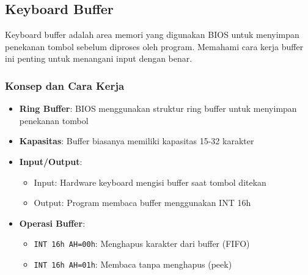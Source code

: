 \documentclass[../main.tex]{subfiles}
\begin{document}
\subsection{Keyboard Buffer}
            Keyboard buffer adalah area memori yang digunakan BIOS untuk menyimpan penekanan tombol sebelum diproses oleh program. Memahami cara kerja buffer ini penting untuk menangani input dengan benar.

            \subsubsection{Konsep dan Cara Kerja}
\begin{itemize}
    \item \textbf{Ring Buffer}: BIOS menggunakan struktur ring buffer untuk menyimpan penekanan tombol
    \item \textbf{Kapasitas}: Buffer biasanya memiliki kapasitas 15-32 karakter
    \item \textbf{Input/Output}: 
        \begin{itemize}
            \item Input: Hardware keyboard mengisi buffer saat tombol ditekan
            \item Output: Program membaca buffer menggunakan INT 16h
        \end{itemize}
    \item \textbf{Operasi Buffer}:
        \begin{itemize}
            \item \texttt{INT 16h AH=00h}: Menghapus karakter dari buffer (FIFO)
            \item \texttt{INT 16h AH=01h}: Membaca tanpa menghapus (peek)
        \end{itemize}
\end{itemize}
\end{document}
